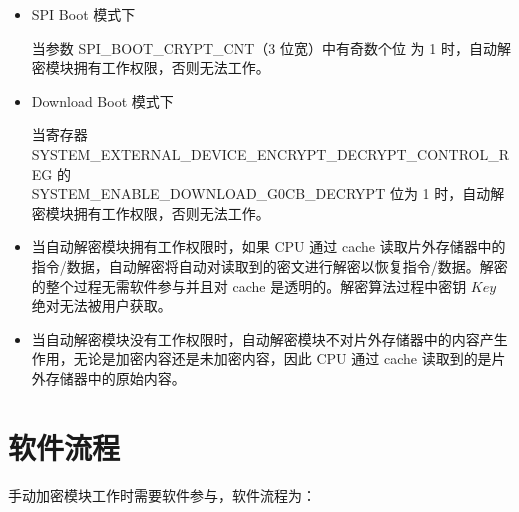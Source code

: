 \documentclass[main\_\_CN.tex]{subfiles}
\begin{document}
\begin{itemize}

    \item SPI Boot 模式下

    当参数 SPI\_BOOT\_CRYPT\_CNT（3 位宽）中有奇数个位 为 1 时，自动解密模块拥有工作权限，否则无法工作。

    \item Download Boot 模式下

    当寄存器 SYSTEM\_EXTERNAL\_DEVICE\_ENCRYPT\_DECRYPT\_CONTROL\_REG 的 \\ SYSTEM\_ENABLE\_DOWNLOAD\_G0CB\_DECRYPT 位为 1 时，自动解密模块拥有工作权限，否则无法工作。

\end{itemize}


\begin{tiplisting}
\vspace{-2em}
\begin{itemize}

\item 当自动解密模块拥有工作权限时，如果 CPU 通过 cache 读取片外存储器中的指令/数据，自动解密将自动对读取到的密文进行解密以恢复指令/数据。解密的整个过程无需软件参与并且对 cache 是透明的。解密算法过程中密钥 \begin{math}Key\end{math} 绝对无法被用户获取。

\item 当自动解密模块没有工作权限时，自动解密模块不对片外存储器中的内容产生作用，无论是加密内容还是未加密内容，因此 CPU 通过 cache 读取到的是片外存储器中的原始内容。

\end{itemize}
\end{tiplisting}


\section{ 软件流程 }
手动加密模块工作时需要软件参与，软件流程为：
\end{document}
